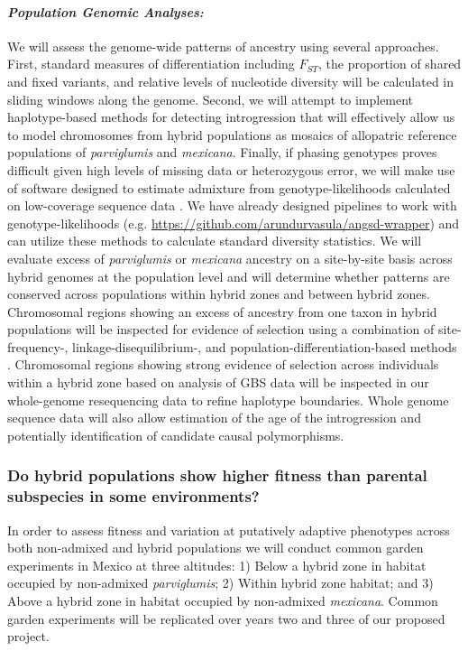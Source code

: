 \paragraph{\emph{Population Genomic Analyses:}} 
We will assess the genome-wide patterns of ancestry using several approaches.  
First, standard measures of differentiation including $F_{ST}$, the proportion of shared and fixed variants, and relative levels of nucleotide diversity \citep{Geneva2014} will be calculated in sliding windows along the genome. 
Second, we will attempt to implement haplotype-based methods for detecting introgression \citep[\emph{e.g.},][]{price2009, lawson2012} that will effectively allow us to model chromosomes from hybrid populations as mosaics of allopatric reference populations of \emph{parviglumis} and \emph{mexicana}.  
Finally, if phasing genotypes \citep{scheet2006fast} proves difficult given high levels of missing data or heterozygous error, we will make use of software designed to estimate admixture from genotype-likelihoods calculated on low-coverage sequence data \citep{skotte2013estimating}. 
We have already designed pipelines to work with genotype-likelihoods (e.g. \url{https://github.com/arundurvasula/angsd-wrapper}) and can utilize these methods to calculate standard diversity statistics.  
We will evaluate excess of \emph{parviglumis} or \emph{mexicana} ancestry on a site-by-site basis across hybrid genomes at the population level and will determine whether patterns are conserved across populations within hybrid zones and between hybrid zones.  Chromosomal regions showing an excess of ancestry from one taxon in hybrid populations will be inspected for evidence of selection using a combination of site-frequency-, linkage-disequilibrium-, and population-differentiation-based methods \citep[reviewed in][]{Vitti2013}. Chromosomal regions showing strong evidence of selection across individuals within a hybrid zone based on analysis of GBS data will be inspected in our whole-genome resequencing data to refine haplotype boundaries. 
Whole genome sequence data will also allow estimation of the age of the introgression and potentially identification of candidate causal polymorphisms.

\subsubsection{Do hybrid populations show higher fitness than parental subspecies in some environments?} 
\label{sss:fitness}
In order to assess fitness and variation at putatively adaptive phenotypes across both non-admixed and  hybrid populations we will conduct common garden experiments in Mexico at three altitudes: 1) Below a hybrid zone in habitat occupied by non-admixed \emph{parviglumis}; 2) Within hybrid zone habitat; and 3) Above a hybrid zone in habitat occupied by non-admixed \emph{mexicana}. 
Common garden experiments will be replicated over years two and three of our proposed project.  

